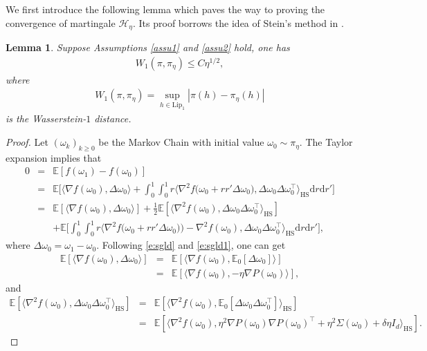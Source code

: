 \documentclass[12pt]{amsart}
\newtheorem{lemma}[theorem]{Lemma}
\theoremstyle{definition}
\theoremstyle{remark}
\numberwithin{equation}{section}
\newcommand{\dif}{\mathrm{d}}
\newcommand{\E}{\mathbb{E}}            %
\newcommand{\Ll}{\langle}
\newcommand{\Rr}{\rangle}
\begin{document}
We first introduce the following lemma which paves the way to proving the convergence of martingale $\mathcal{H}_\eta$. Its proof borrows the idea of Stein's method in \cite[Theorem 2.5]{FSX19}.
\begin{lemma}\label{lem: pipieta}
Suppose Assumptions \ref{assu1} and \ref{assu2} hold, one has
\begin{eqnarray}
W_1(\pi,\pi_\eta)\le C\eta^{1/2},
\end{eqnarray}
where
\begin{eqnarray*}
	W_1(\pi,\pi_\eta)=\sup_{h\in\mathrm{Lip_1}}|\pi(h)-\pi_\eta(h)|
\end{eqnarray*}
is the Wasserstein-$1$ distance.
\end{lemma}
\begin{proof}
Let $(\omega_k)_{k\ge0}$ be the Markov Chain with initial value $\omega_0\sim\pi_\eta$. The Taylor expansion implies that
\begin{eqnarray}\label{e:lem3.1.1}
0&=&\E[f(\omega_1)-f(\omega_0)]\nonumber\\
&=&\E\big[\Ll \nabla f(\omega_0), \Delta\omega_0 \Rr
+\int_0^1\int_0^1 r\Ll \nabla^2f\big(\omega_0+rr'\Delta\omega_0\big),\Delta\omega_0\Delta\omega_0^\top    \Rr_{\text {HS}}\dif r\dif r'\big]\nonumber\\
&=&\E[\Ll \nabla f(\omega_0), \Delta\omega_0 \Rr]+\frac12\E[\Ll \nabla^2f (\omega_0),\Delta\omega_0\Delta\omega_0^\top     \Rr_{\text {HS}}]\nonumber\\
&&+\E\big[\int_0^1\int_0^1 r\Ll \nabla^2f\big(\omega_0+rr'\Delta\omega_0)\big)-\nabla^2f(\omega_0),\Delta\omega_0\Delta\omega_0^\top    \Rr_{\text {HS}}\dif r\dif r'\big],
\end{eqnarray}
where $\Delta \omega_0=\omega_1-\omega_0$. Following \eqref{e:sgld} and \eqref{e:sgld1}, one can get
\begin{eqnarray*}
	\E[\Ll \nabla f(\omega_0), \Delta \omega_0 \Rr]&=&\E[\Ll \nabla f(\omega_0), \E_0[\Delta \omega_0] \Rr]\\
	&=&\E[\Ll \nabla f(\omega_0),-\eta\nabla P(\omega_{0})\Rr],
\end{eqnarray*}
and
\begin{eqnarray*}
	\E[\Ll \nabla^2f (\omega_0),\Delta \omega_0\Delta \omega_0^\top     \Rr_{\text {HS}}]
	&=&\E[\Ll \nabla^2f (\omega_0),\E_0[\Delta \omega_0\Delta \omega_0^\top]     \Rr_{\text {HS}}]\\
	&=&\E[\Ll \nabla^2f (\omega_0), \eta^2\nabla P(\omega_{0})\nabla P(\omega_{0})^\top+\eta^2\Sigma(\omega_0)+\delta\eta I_d    \Rr_{\text {HS}}].

\end{eqnarray*}
\end{proof}
\end{document}
